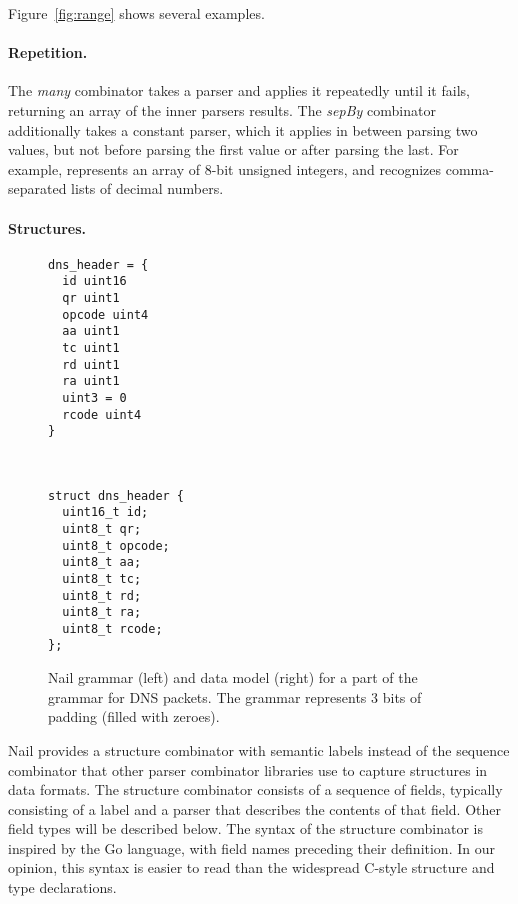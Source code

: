 Figure~\ref{fig:range} shows several examples.

\paragraph{Repetition.}

The \emph{many} combinator takes a parser and applies it repeatedly
until it fails, returning an array of the inner parsers results. The
\emph{sepBy} combinator
additionally takes a constant parser, which it applies in between parsing
two values, but not before parsing the first value or after parsing the
last.
For example,  represents an array of 8-bit unsigned
integers, and  recognizes
comma-separated lists of decimal numbers.

\paragraph{Structures.}

\begin{figure}[tb]
\smaller[0.5]
\begin{minipage}{0.45\columnwidth}
\begin{verbatim}
dns_header = {
  id uint16
  qr uint1
  opcode uint4
  aa uint1 
  tc uint1
  rd uint1
  ra uint1
  uint3 = 0
  rcode uint4
}
\end{verbatim} 
\end{minipage}
~
\begin{minipage}{0.45\columnwidth}
\begin{verbatim}
struct dns_header {
  uint16_t id;
  uint8_t qr;
  uint8_t opcode;
  uint8_t aa;
  uint8_t tc;
  uint8_t rd;
  uint8_t ra;
  uint8_t rcode;
};
\end{verbatim} 
\end{minipage}

\caption{Nail grammar (left) and data model (right) for a part of the
grammar for DNS packets.  The  grammar represents
3 bits of padding (filled with zeroes).}
\label{fig:dns-struct}
\end{figure}


Nail provides a structure combinator with semantic labels instead of the sequence combinator that
other parser combinator libraries use to capture structures in data formats. 
The structure combinator consists of a sequence of fields, typically consisting of a label and a
parser that describes the contents of that field. Other field types will be described below.
 The syntax of the structure combinator is inspired by the Go language\cite{golang}, with field names preceding their definition.
In our opinion, this syntax is easier to read than the widespread C-style structure and type
declarations.

